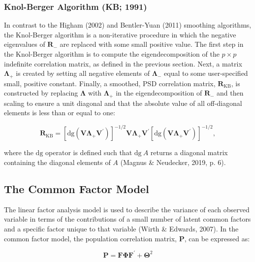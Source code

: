 \documentclass[
  english,
  man]{apa6}
\begin{document}
\hypertarget{knol-berger-algorithm-kb-1991}{%
\subsubsection{Knol-Berger Algorithm (KB; 1991)}\label{knol-berger-algorithm-kb-1991}}

In contrast to the Higham (2002) and Bentler-Yuan (2011) smoothing algorithms, the Knol-Berger algorithm is a non-iterative procedure in which the negative eigenvalues of \(\mathbf{R}_{-}\) are replaced with some small positive value. The first step in the Knol-Berger algorithm is to compute the eigendecomposition of the \(p \times p\) indefinite correlation matrix, as defined in the previous section. Next, a matrix \(\mathbf{\Lambda_+}\) is created by setting all negative elements of \(\mathbf{\Lambda}_-\) equal to some user-specified small, positive constant. Finally, a smoothed, PSD correlation matrix, \(\mathbf{R}_{\textrm{KB}}\), is constructed by replacing \(\mathbf{\Lambda}\) with \(\mathbf{\Lambda_+}\) in the eigendecomposition of \(\mathbf{R}_{-}\) and then scaling to ensure a unit diagonal and that the absolute value of all off-diagonal elements is less than or equal to one:

\begin{equation}
\mathbf{R}_{\textrm{KB}}= [\textrm{dg}(\mathbf{V \Lambda_+ V}^\prime)]^{-1/2} \mathbf{V \Lambda_+ V}^\prime [\textrm{dg}(\mathbf{V \Lambda_+ V}^\prime)]^{-1/2},
\label{eq:Rkb}
\end{equation}

where the \(\textrm{dg}\) operator is defined such that \(\textrm{dg}\: A\) returns a diagonal matrix containing the diagonal elements of \(A\) (Magnus \& Neudecker, 2019, p. 6).

\hypertarget{the-common-factor-model}{%
\subsection{The Common Factor Model}\label{the-common-factor-model}}

The linear factor analysis model is used to describe the variance of each observed variable in terms of the contributions of a small number of latent common factors and a specific factor unique to that variable (Wirth \& Edwards, 2007). In the common factor model, the population correlation matrix, \(\mathbf{P}\), can be expressed as:

\begin{equation}
\mathbf{P} = \mathbf{F} \mathbf{\Phi} \mathbf{F}^{\prime} + \mathbf{\Theta}^2
\label{eq:cfa}
\end{equation}
\end{document}
